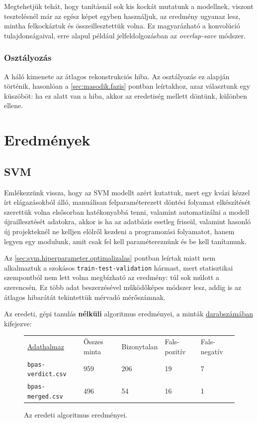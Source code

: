 Megtehetjük tehát, hogy tanításnál sok kis kockát mutatunk a modellnek, viszont tesztelésnél
már az egész képet egyben használjuk, az eredmény ugyanaz lesz, mintha felkockáztuk 
és összeillesztettük volna. Ez magyarázható a konvolúció 
tulajdonságaival, erre alapul például jelfeldolgozásban az \textit{overlap-save} módszer.



\subsubsection{Osztályozás}

A háló kimenete az átlagos rekonstrukciós hiba. Az osztályozás ez alapján történik,
hasonlóan a \ref{sec:masodik.fazis} pontban leírtakhoz, azaz választunk egy küszöböt:
ha ez alatt van a hiba, akkor az eredetiség mellett döntünk, különben ellene.



\newpage
\section{Eredmények}

\subsection{SVM}
\label{sec:svm.eredmenyek}

Emlékezzünk vissza, hogy az SVM modellt azért kutattuk, mert egy kvázi kézzel írt elágazásokból 
álló, manuálisan felparaméterezett döntési folyamat elkészítését szerettük volna elsősorban
hatékonyabbá tenni, valamint automatizálni a modell újraillesztését adatokra, akkor is ha az 
adatbázis esetleg frissül, valamint hasonló új projekteknél ne kelljen elölről kezdeni a programozási
folyamatot, hanem legyen egy modulunk, amit csak fel kell paramétereznünk és be kell tanítanunk.


Az \ref{sec:svm.hiperparameter.optimalizalas} pontban leírtak miatt nem alkalmaztuk a szokásos 
\texttt{train-test-validation} hármast, mert statisztikai szempontból nem lett volna megbízható
az eredmény: túl sok múlott a szerencsén. Ez több adat beszerzésével működőképes módszer lesz,
addig is az átlagos hibarátát tekintettük mérvadó mérőszámnak.



\noindent
Az eredeti, gépi tanulás \textbf{nélküli} algoritmus eredményei, a minták \underline{darabszámában} 
kifejezve:

\begin{figure}[h!]
	\centering
	\begin{tabular}{ l l l l l }
		\underline{Adathalmaz}		& Összes minta 	& Bizonytalan	& Fals-pozitív	& Fals-negatív \\
		\texttt{bpas-verdict.csv}\footnotemark 	& 959 			& 206 			& 19	 	& 7			\\
		\texttt{bpas-merged.csv}\footnotemark[\value{footnote}] 	& 496			& 54 			& 16		& 1			\\
	\end{tabular}

	\caption{Az eredeti algoritmus eredményei.}
\end{figure}

